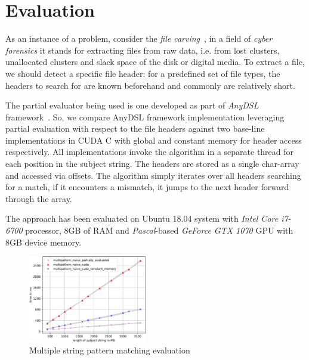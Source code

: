 \documentclass[sigplan]{acmart}\settopmatter{}
\newcommand\todo[1]{{\color{red}#1}}
\begin{document}




\section{Evaluation}

As an instance of a problem, consider the \textit{file carving}~\cite{DataCarving}, in a field of \textit{cyber forensics} it stands for extracting files from raw data, i.e. from lost clusters, unallocated clusters and slack space of the disk or digital media.
To extract a file, we should detect a specific file header: for a predefined set of file types, the headers to search for are known beforehand and commonly are relatively short.

The partial evaluator being used is one developed as part of \textit{AnyDSL} framework~\cite{LeiBa}.
So, we compare AnyDSL framework implementation leveraging partial evaluation with respect to the file headers against two base-line implementations in CUDA C with global and constant memory for header access respectively.
All implementations invoke the algorithm in a separate thread for each position in the subject string.
The headers are stored as a single char-array and accessed via offsets.
The algorithm simply iterates over all headers searching for a match, if it encounters a mismatch, it jumps to the next header forward through the array.


The approach has been evaluated on Ubuntu 18.04 system with \textit{Intel Core i7-6700} processor, 8GB of RAM and \textit{Pascal}-based \textit{GeForce GTX 1070} GPU with 8GB device memory.

\begin{figure}[t]
  \centering
  \includegraphics[width=0.46\textwidth]{results.pdf}
  \caption{Multiple string pattern matching evaluation}
  \label{fig:eval}
\end{figure}
\end{document}

